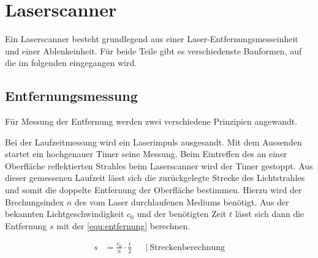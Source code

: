\documentclass[a4paper,12pt,bibliography=totoc, listof=totoc,titlepage,pointlessnumbers]{scrreprt}
\begin{document}
\section{Laserscanner}
Ein Laserscanner besteht grundlegend aus einer Laser-Entfernungsmesseinheit und einer Ablenkeinheit. Für beide Teile gibt es verschiedenste Bauformen, auf die im folgenden eingegangen wird.

\subsection{Entfernungsmessung}
Für Messung der Entfernung werden zwei verschiedene Prinzipien angewandt.

Bei der Laufzeitmessung wird ein Laserimpuls ausgesandt. Mit dem Aussenden startet ein hochgenauer Timer seine Messung. Beim Eintreffen des an einer Oberfläche reflektierten Strahles beim Laserscanner wird der Timer gestoppt. Aus dieser gemessenen Laufzeit lässt sich die zurückgelegte Strecke des Lichtstrahles und somit die doppelte Entfernung der Oberfläche bestimmen. Hierzu wird der Brechungsindex \(n\) des vom Laser durchlaufenen Mediums benötigt. Aus der bekannten Lichtgeschwindigkeit \(c_0\) und der benötigten Zeit \(t\) lässt sich dann die Entfernung \(s\) mit der \autoref{equ:entfernung} berechnen.

\begin{equation}
\begin{aligned}
s &=  \frac{c_0}{n} \cdot \frac{t}{2}  && \left|\  \text{Streckenberechnung} \right. \\
\end{aligned}
\label{equ:entfernung}
\end{equation}
\end{document}
